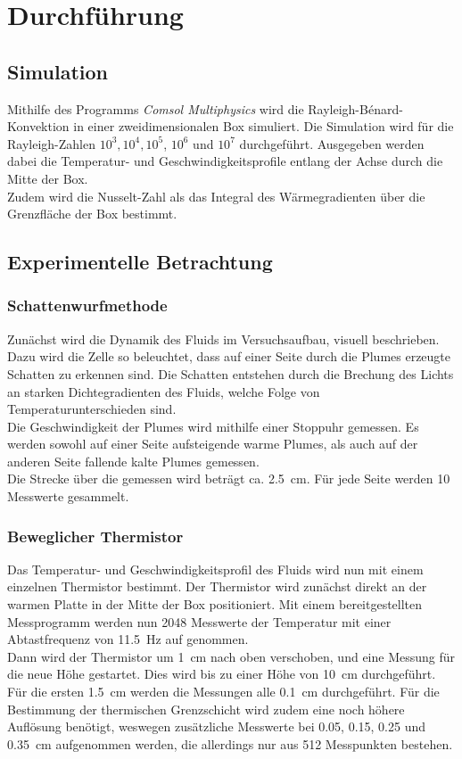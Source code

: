 \section{Durchführung}
\subsection{Simulation}
Mithilfe des Programms \emph{Comsol Multiphysics} \cite{comsol} wird die Rayleigh-B\'enard-Konvektion in einer zweidimensionalen Box simuliert. 
Die Simulation wird für die Rayleigh-Zahlen $10^3, 10^4, 10^5$, $10^6$ und $10^7$ durchgeführt. 
Ausgegeben werden dabei die Temperatur- und Geschwindigkeitsprofile entlang der Achse durch die Mitte der Box.
\\
Zudem wird die Nusselt-Zahl als das Integral des Wärmegradienten über die Grenzfläche der Box bestimmt.

\subsection{Experimentelle Betrachtung}
\subsubsection{Schattenwurfmethode}
Zunächst wird die Dynamik des Fluids im Versuchsaufbau, visuell beschrieben.
Dazu wird die Zelle so beleuchtet, dass auf einer Seite durch die Plumes erzeugte Schatten zu erkennen sind.
Die Schatten entstehen durch die Brechung des Lichts an starken Dichtegradienten des Fluids, welche Folge von Temperaturunterschieden sind.
\\
Die Geschwindigkeit der Plumes wird mithilfe einer Stoppuhr gemessen. 
Es werden sowohl auf einer Seite aufsteigende warme Plumes, als auch auf der anderen Seite fallende kalte Plumes gemessen.
\\
Die Strecke über die gemessen wird beträgt ca. 2.5~cm. Für jede Seite werden 10 Messwerte gesammelt.
\subsubsection{Beweglicher Thermistor}
Das Temperatur- und Geschwindigkeitsprofil des Fluids wird nun mit einem einzelnen Thermistor bestimmt.
Der Thermistor wird zunächst direkt an der warmen Platte in der Mitte der Box positioniert. 
Mit einem bereitgestellten Messprogramm werden nun 2048 Messwerte der Temperatur mit einer Abtastfrequenz von 11.5~Hz auf genommen. 
\\ 
Dann wird der Thermistor um 1~cm nach oben verschoben, und eine Messung für die neue Höhe gestartet. Dies wird bis zu einer Höhe von 10~cm durchgeführt.
\\
Für die ersten 1.5~cm werden die Messungen alle 0.1~cm durchgeführt. 
Für die Bestimmung der thermischen Grenzschicht wird zudem eine noch höhere Auflösung benötigt, weswegen zusätzliche Messwerte bei 0.05, 0.15, 0.25 und 0.35~cm aufgenommen werden, die allerdings nur aus 512 Messpunkten bestehen.

